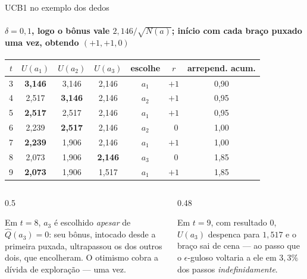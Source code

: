 \documentclass[aspectratio=169, 10pt]{beamer}
\newcommand{\Qhat}{\widehat{Q}}
\newcommand{\Nc}{N}                         %
\begin{document}
\begin{frame}{UCB1 no exemplo dos dedos}
  \framesubtitle{$\delta = 0{,}1$, logo o bônus vale $2{,}146/\sqrt{\Nc(a)}$; início com cada braço puxado uma vez, obtendo $(+1, +1, 0)$}

  \centering\scriptsize
  \begin{tabular}{ccccccc}
    \toprule
    $t$ & $U(a_1)$ & $U(a_2)$ & $U(a_3)$ & \textbf{escolhe} & $r$
      & \textbf{arrepend. acum.} \\
    \midrule
    3 & \textbf{3,146} & 3,146 & 2,146 & $a_1$ & $+1$ & 0,90 \\
    4 & 2,517 & \textbf{3,146} & 2,146 & $a_2$ & $+1$ & 0,95 \\
    5 & \textbf{2,517} & 2,517 & 2,146 & $a_1$ & $+1$ & 0,95 \\
    6 & 2,239 & \textbf{2,517} & 2,146 & $a_2$ & $\;\;0$ & 1,00 \\
    7 & \textbf{2,239} & 1,906 & 2,146 & $a_1$ & $+1$ & 1,00 \\
    8 & 2,073 & 1,906 & \textbf{2,146} & $a_3$ & $\;\;0$ & 1,85 \\
    9 & \textbf{2,073} & 1,906 & 1,517 & $a_1$ & $+1$ & 1,85 \\
    \bottomrule
  \end{tabular}

  \vspace{0.7em}
  \begin{columns}[T]
    \begin{column}{0.5\textwidth}
      \begin{ideiabox}
        Em $t = 8$, $a_3$ é escolhido \emph{apesar} de $\Qhat(a_3) = 0$: seu
        bônus, intocado desde a primeira puxada, ultrapassou os dos outros
        dois, que encolheram. O otimismo cobra a dívida de exploração ---
        uma vez.
      \end{ideiabox}
    \end{column}
    \begin{column}{0.48\textwidth}
      \begin{alertabox}
        Em $t = 9$, com resultado $0$, $U(a_3)$ despenca para $1{,}517$ e o
        braço sai de cena --- ao passo que o $\epsilon$-guloso voltaria a
        ele em $3{,}3\%$ dos passos \emph{indefinidamente}.
      \end{alertabox}
    \end{column}
  \end{columns}
\end{frame}
\end{document}
